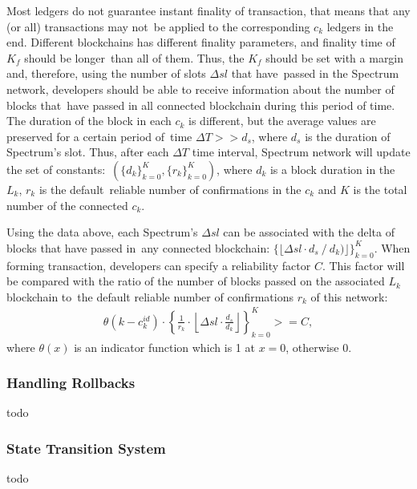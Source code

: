 Most ledgers do not guarantee instant finality of transaction, that means that any (or all) transactions may not\
be applied to the corresponding $c_k$ ledgers in the end.
Different blockchains has different finality parameters, and finality time of $K_f$ should be longer\
than all of them.
Thus, the $K_f$ should be set with a margin and, therefore, using the number of slots $\Delta sl$ that have\
passed in the Spectrum network, developers should be able to receive information about the number of blocks that\
have passed in all connected blockchain during this period of time.
The duration of the block in each $c_k$ is different, but the average values are preserved for a certain period of\
time ${\Delta T >> d_s}$, where $d_s$ is the duration of Spectrum's slot.
Thus, after each $\Delta T$ time interval, Spectrum network will update the set of constants:\
${(\{d_{k}\}_{k=0}^{K},\{r_k\}_{k=0}^{K})}$, where $d_k$ is a block duration in the $L_k$, $r_k$ is the default\
reliable number of confirmations in the $c_k$ and $K$ is the total number of the connected $c_k$.

Using the data above, each Spectrum's $\Delta sl$ can be associated with the delta of blocks that have passed in\
any connected blockchain: ${\{\lfloor \Delta sl \cdot d_s \mathbin{/} d_k)\rfloor\}_{k=0}^{K}}$.
When forming transaction, developers can specify a reliability factor $C$.
This factor will be compared with the ratio of the number of blocks passed on the associated $L_k$ blockchain to\
the default reliable number of confirmations $r_k$ of this network:
\begin{align*}
    \theta(k-c_k^{id})\cdot \left\{\frac{1}{r_k} \cdot \left\lfloor \Delta sl \cdot
    \frac{d_s}{d_k}\right\rfloor\right\}_{k=0}^{K} >= C,
\end{align*}
where $\theta(x)$ is an indicator function which is 1 at $x = 0$, otherwise 0.

\subsubsection{Handling Rollbacks}\label{subsec:rollbacks}
todo

\subsubsection{State Transition System}
todo